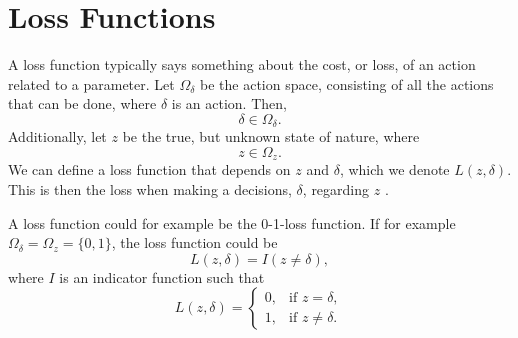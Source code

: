 \section{Loss Functions}
\label{theory_loss_functions}
A loss function typically says something about the cost, or loss, of an action related to a parameter. Let $\Omega_{\delta}$ be the action space, consisting of all the actions that can be done, where $\delta$ is an action. Then,
\begin{equation*}
    \delta \in \Omega_{\delta}.
\end{equation*}
Additionally, let $z$ be the true, but unknown state of nature, where 
\begin{equation*}
    z \in \Omega_z.
\end{equation*} 
We can define a loss function that depends on $z$ and $\delta$, which we denote $L(z,\delta)$. This is then the loss when making a decisions, $\delta$, regarding $z$ \citep{statisticalDecisionTheoryLiese2008}.

A loss function could for example be the 0-1-loss function. If for example $\Omega_{\delta}= \Omega_z = \{0,1\}$, the loss function could be
\begin{equation}
\label{loss_func_indicator}
    L(z,\delta) = I(z \neq \delta),
\end{equation}
where $I$ is an indicator function such that
\begin{equation*}
    L(z,\delta) =
    \begin{cases}
        0,&  \text{if } z = \delta, \\
        1,&  \text{if } z \neq \delta.
    \end{cases}
\end{equation*}


